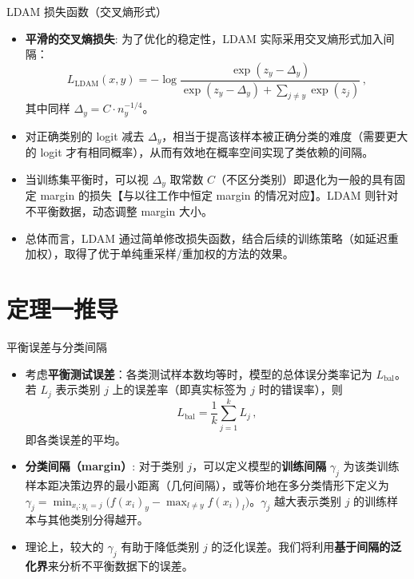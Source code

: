 \documentclass{beamer}
\begin{document}
\begin{frame}{LDAM 损失函数（交叉熵形式）}
    \begin{itemize}
        \item \textbf{平滑的交叉熵损失}: 为了优化的稳定性，LDAM 实际采用交叉熵形式加入间隔：
        \[
            L_{\text{LDAM}}(x,y) = -\log \frac{\exp(z_y - \Delta_y)}{\exp(z_y - \Delta_y) + \sum_{j \neq y}\exp(z_j)}\,,
        \] 
        其中同样 $\Delta_y = C \cdot n_y^{-1/4}$。
        \item 对正确类别的 logit 减去 $\Delta_y$，相当于提高该样本被正确分类的难度（需要更大的 logit 才有相同概率），从而有效地在概率空间实现了类依赖的间隔。
        \item 当训练集平衡时，可以视 $\Delta_y$ 取常数 $C$（不区分类别）即退化为一般的具有固定 margin 的损失【与以往工作中恒定 margin 的情况对应】。LDAM 则针对不平衡数据，动态调整 margin 大小。
        \item 总体而言，LDAM 通过简单修改损失函数，结合后续的训练策略（如延迟重加权），取得了优于单纯重采样/重加权的方法的效果。
    \end{itemize}
\end{frame}

\section{定理一推导}
\begin{frame}{平衡误差与分类间隔}
    \begin{itemize}
        \item 考虑\textbf{平衡测试误差}：各类测试样本数均等时，模型的总体误分类率记为 $L_{\text{bal}}$。若 $L_j$ 表示类别 $j$ 上的误差率（即真实标签为 $j$ 时的错误率），则 
        \[
            L_{\text{bal}} = \frac{1}{k}\sum_{j=1}^k L_j\,,
        \] 
        即各类误差的平均。
        \item \textbf{分类间隔（margin）}: 对于类别 $j$，可以定义模型的\textbf{训练间隔} $\gamma_j$ 为该类训练样本距决策边界的最小距离（几何间隔），或等价地在多分类情形下定义为 $\gamma_j = \min_{x_i:y_i=j}\big(f(x_i)_y - \max_{l \neq y}f(x_i)_l\big)$。$\gamma_j$ 越大表示类别 $j$ 的训练样本与其他类别分得越开。
        \item 理论上，较大的 $\gamma_j$ 有助于降低类别 $j$ 的泛化误差。我们将利用\textbf{基于间隔的泛化界}来分析不平衡数据下的误差。
    \end{itemize}
\end{frame}
\end{document}
